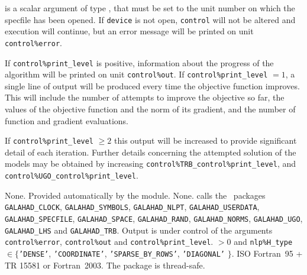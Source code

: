 \documentclass{galahad}
\newcommand{\packagename}{BGO}
\begin{document}
\begin{description}

 is a scalar \intentin argument of type \integer,
that must be set to the unit number on which the specfile
has been opened. If {\tt device} is not open, {\tt control} will
not be altered and execution will continue, but an error message
will be printed on unit {\tt control\%error}.

\end{description}


\galinfo
If {\tt control\%print\_level} is positive, information about the progress
of the algorithm will be printed on unit {\tt control\-\%out}.
If {\tt control\%print\_level} $= 1$, a single line of output will be produced
every time the objective function improves. 
This will include the number of attempts to improve the objective so far, 
the values of the objective function and the norm of its
gradient, and the number of function and gradient evaluations.

If {\tt control\%print\_level} $\geq 2$ this
output will be increased to provide significant detail of each iteration.
Further details concerning the attempted solution of the models
may be obtained by increasing
{\tt control\%TRB\_control\%print\_\-level},
and
{\tt control\%UGO\_control\%print\-\_level}.


\galgeneral

\galcommon None.
\galworkspace Provided automatically by the module.
\galroutines None.
\galmodules {\tt \packagename\_solve} calls the \galahad\ packages
{\tt GALAHAD\_CLOCK},
{\tt GALAHAD\_SY\-M\-BOLS}, \sloppy
{\tt GALAHAD\_NLPT},
{\tt GALAHAD\_USERDATA},
{\tt GALAHAD\_SPECFILE},
{\tt GALAHAD\_SPACE},
{\tt GALAHAD\_RAND},
{\tt GALAHAD\_\-NORMS},
{\tt GALAHAD\_UGO},
{\tt GALAHAD\_LHS}
and 
{\tt GALAHAD\_TRB}.
\galio Output is under control of the arguments
 {\tt control\%error}, {\tt control\%out} and {\tt control\%print\_level}.
 $> 0$ and
{\tt nlp\%H\_type} $\in \{${\tt 'DENSE'},
 {\tt 'COORDINATE'}, {\tt 'SPARSE\_BY\_ROWS'}, {\tt 'DIAGONAL'} $\}$.
\galportability ISO Fortran~95 + TR 15581 or Fortran~2003.
The package is thread-safe.

\end{document}
